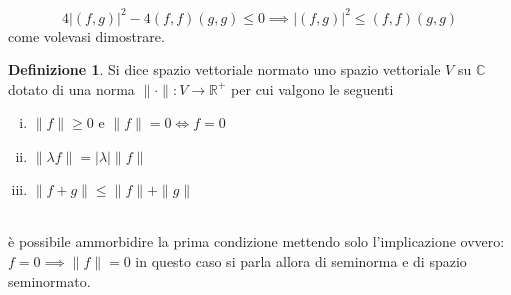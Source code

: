 \documentclass[12pt]{book}
\theoremstyle{plain}
\newcommand{\R}{\mathbb{R}}
\newcommand{\C}{\mathbb{C}}
\theoremstyle{definition}
\newtheorem{dfn}[thm]{Definizione}
\theoremstyle{remark}
\begin{document}
\[4|(f,g)|^2 - 4(f,f)(g,g)\leq 0 \implies |(f,g)|^2\leq(f,f)(g,g) \]
come volevasi dimostrare.
\begin{dfn}
\label{def:norma}
Si dice spazio vettoriale normato uno spazio vettoriale $V$ su $\C$ dotato di una norma $\|\cdot \|:V\to\R^+$
per cui valgono le seguenti
\begin{enumerate}[i.]
\item $\|f\|\geq 0 $ e $\|f\| = 0\iff f=0$
\item $\|\lambda f\|= |\lambda| \|f\|$
\item $\|f+g\|\leq \|f\|+\|g\|$
\end{enumerate}
\end{dfn}\leavevmode
\\
è possibile ammorbidire la prima condizione mettendo solo l'implicazione ovvero: $f=0\implies \|f\|=0$ in questo caso si parla allora di seminorma e di spazio seminormato.
\end{document}
